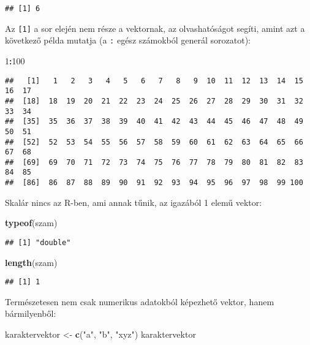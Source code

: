 \documentclass[]{book}
\newenvironment{Shaded}{\begin{snugshade}}{\end{snugshade}}
\newcommand{\KeywordTok}[1]{\textcolor[rgb]{0.13,0.29,0.53}{\textbf{#1}}}
\newcommand{\DecValTok}[1]{\textcolor[rgb]{0.00,0.00,0.81}{#1}}
\newcommand{\StringTok}[1]{\textcolor[rgb]{0.31,0.60,0.02}{#1}}
\newcommand{\OperatorTok}[1]{\textcolor[rgb]{0.81,0.36,0.00}{\textbf{#1}}}
\newcommand{\NormalTok}[1]{#1}
\begin{document}
\begin{verbatim}
## [1] 6
\end{verbatim}

Az \texttt{{[}1{]}} a sor elején nem része a vektornak, az
olvashatóságot segíti, amint azt a következő példa mutatja (a \texttt{:}
egész számokból generál sorozatot):

\begin{Shaded}
\begin{Highlighting}[]
\DecValTok{1}\OperatorTok{:}\DecValTok{100}
\end{Highlighting}
\end{Shaded}

\begin{verbatim}
##   [1]   1   2   3   4   5   6   7   8   9  10  11  12  13  14  15  16  17
##  [18]  18  19  20  21  22  23  24  25  26  27  28  29  30  31  32  33  34
##  [35]  35  36  37  38  39  40  41  42  43  44  45  46  47  48  49  50  51
##  [52]  52  53  54  55  56  57  58  59  60  61  62  63  64  65  66  67  68
##  [69]  69  70  71  72  73  74  75  76  77  78  79  80  81  82  83  84  85
##  [86]  86  87  88  89  90  91  92  93  94  95  96  97  98  99 100
\end{verbatim}

Skalár nincs az R-ben, ami annak tűnik, az igazából 1 elemű vektor:

\begin{Shaded}
\begin{Highlighting}[]
\KeywordTok{typeof}\NormalTok{(szam)}
\end{Highlighting}
\end{Shaded}

\begin{verbatim}
## [1] "double"
\end{verbatim}

\begin{Shaded}
\begin{Highlighting}[]
\KeywordTok{length}\NormalTok{(szam)}
\end{Highlighting}
\end{Shaded}

\begin{verbatim}
## [1] 1
\end{verbatim}

Természetesen nem csak numerikus adatokból képezhető vektor, hanem
bármilyenből:

\begin{Shaded}
\begin{Highlighting}[]
\NormalTok{karaktervektor <-}\StringTok{ }\KeywordTok{c}\NormalTok{(}\StringTok{"a"}\NormalTok{, }\StringTok{"b"}\NormalTok{, }\StringTok{"xyz"}\NormalTok{)}
\NormalTok{karaktervektor}
\end{Highlighting}
\end{Shaded}
\end{document}
